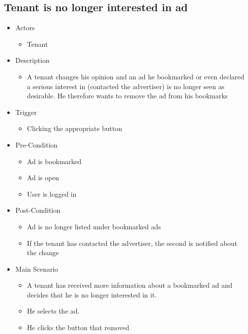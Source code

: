 \documentclass[a4paper,11pt]{article}
\begin{document}
\subsection*{Tenant is no longer interested in ad}
\begin{itemize}
	\item Actors
		\begin{itemize}
			\item Tenant
		\end{itemize}
	\item Description
		\begin{itemize}
			\item A tenant changes his opinion and an ad he bookmarked or even declared a serious interest in (contacted the advertiser) is no longer seen as desirable. He therefore wants to remove the ad from his bookmarks
		\end{itemize}
	\item Trigger
		\begin{itemize}
			\item Clicking the appropriate button
		\end{itemize}
	\item Pre-Condition
		\begin{itemize}
			\item Ad is bookmarked
			\item Ad is open
			\item User is logged in
		\end{itemize}
	\item Post-Condition
		\begin{itemize}
			\item Ad is no longer listed under bookmarked ads
			\item If the tenant has contacted the advertiser, the second is notified about the change
		\end{itemize}
	\item Main Scenario
		\begin{itemize}
			\item A tenant has received more information about a bookmarked ad and decides that he is no longer interested in it.
			\item He selects the ad.
			\item He clicks the button that removed
		\end{itemize}
\end{itemize}
\end{document}
